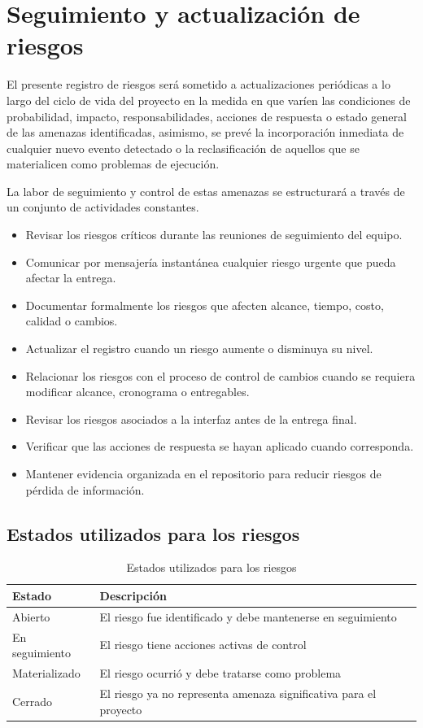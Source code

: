 \documentclass[11pt,spanish]{article}
\begin{document}
\section{Seguimiento y actualización de riesgos}

El presente registro de riesgos será sometido a actualizaciones periódicas a lo largo del ciclo de vida del proyecto en la medida en que varíen las condiciones de probabilidad, impacto, responsabilidades, acciones de respuesta o estado general de las amenazas identificadas, asimismo, se prevé la incorporación inmediata de cualquier nuevo evento detectado o la reclasificación de aquellos que se materialicen como problemas de ejecución.

La labor de seguimiento y control de estas amenazas se estructurará a través de un conjunto de actividades constantes.

\begin{itemize}[leftmargin=*, label={\textbullet}]
    \item Revisar los riesgos críticos durante las reuniones de seguimiento del equipo.
    \item Comunicar por mensajería instantánea cualquier riesgo urgente que pueda afectar la entrega.
    \item Documentar formalmente los riesgos que afecten alcance, tiempo, costo, calidad o cambios.
    \item Actualizar el registro cuando un riesgo aumente o disminuya su nivel.
    \item Relacionar los riesgos con el proceso de control de cambios cuando se requiera modificar alcance, cronograma o entregables.
    \item Revisar los riesgos asociados a la interfaz antes de la entrega final.
    \item Verificar que las acciones de respuesta se hayan aplicado cuando corresponda.
    \item Mantener evidencia organizada en el repositorio para reducir riesgos de pérdida de información.
\end{itemize}

\subsection{Estados utilizados para los riesgos}

\begin{table}[H]
\centering
\caption{Estados utilizados para los riesgos}
\label{tab-estados-riesgos}
{\small
\begin{tabularx}{\textwidth}{p{4cm} Y}
\toprule
\textbf{Estado} & \textbf{Descripción} \\
\midrule
Abierto & El riesgo fue identificado y debe mantenerse en seguimiento \\
En seguimiento & El riesgo tiene acciones activas de control \\
Materializado & El riesgo ocurrió y debe tratarse como problema \\
Cerrado & El riesgo ya no representa amenaza significativa para el proyecto \\
\bottomrule
\end{tabularx}
}
\end{table}
\end{document}
